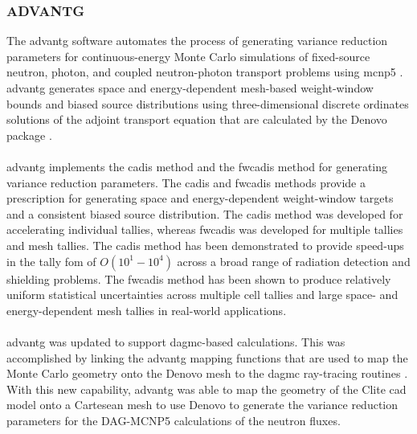 \documentclass[12pt]{article}
\begin{document}
\subsubsection{ADVANTG}
The \gls{advantg} software automates the 
process of generating variance reduction parameters for continuous-energy Monte 
Carlo simulations of fixed-source neutron, photon, and coupled neutron-photon 
transport problems using \gls{mcnp5} \cite{advantg}. \gls{advantg} generates 
space and  energy-dependent mesh-based weight-window bounds and biased source 
distributions using three-dimensional discrete ordinates solutions of the 
adjoint transport equation that are calculated by the Denovo package 
\cite{denovo}. 
\\
\\
\gls{advantg} implements the \gls{cadis} method \cite{wagnerNSECADIS} and the 
\gls{fwcadis} method \cite{wagnerNSEFWCADIS} for generating variance reduction 
parameters. The \gls{cadis} and \gls{fwcadis} methods provide a prescription for
generating space and energy-dependent weight-window targets and a consistent 
biased source distribution. The \gls{cadis} method was developed for accelerating
individual tallies, whereas \gls{fwcadis} was developed for multiple tallies and
mesh tallies. The \gls{cadis} method has been demonstrated to provide speed-ups 
in the tally \gls{fom} of $O(10^1-10^4)$ across a broad range of radiation 
detection and shielding problems. The \gls{fwcadis} method has been shown to produce
 relatively uniform statistical uncertainties across multiple cell tallies and 
large space- and energy-dependent mesh tallies in real-world applications.
\\
\\
\gls{advantg} was updated to support \gls{dagmc}-based calculations. This was 
accomplished by linking the \gls{advantg} mapping functions that are used to 
map the Monte Carlo geometry onto the Denovo mesh to the \gls{dagmc}
ray-tracing routines \cite{biondoMC2015}. With this new capability, 
\gls{advantg} was able to map the geometry of the Clite \gls{cad} model onto a 
Cartesean mesh to use Denovo to generate the variance reduction parameters 
for the DAG-MCNP5 calculations of the neutron fluxes.
\end{document}
